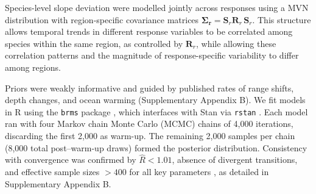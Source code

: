 \documentclass[9pt,twocolumn,twoside]{pnas-new}
\begin{document}
{Species-level slope deviation were modelled jointly across responses using a MVN distribution with region-specific covariance matrices $\boldsymbol{\Sigma_r} = \mathbf{S}_{r}\mathbf{R}_{r}\,\mathbf{S}_{r}$. This structure allows temporal trends in different response variables to be correlated among species within the same region, as controlled by $\mathbf{R}_{r}$, while allowing these correlation patterns and the magnitude of response-specific variability to differ among regions.

Priors were weakly informative and guided by published rates of range shifts, depth changes, and ocean warming (Supplementary Appendix B). We fit models in R using the \texttt{brms} package \citep{burkner_brms_2017}, which interfaces with Stan via \texttt{rstan} \citep{stan2024,stan_development_team_rstan_2024}. Each model ran with four Markov chain Monte Carlo (MCMC) chains of 4,000 iterations, discarding the first 2,000 as warm-up. The remaining 2,000 samples per chain (8,000 total post–warm-up draws) formed the posterior distribution. Consistency with convergence was confirmed by $\hat{R} < 1.01$, absence of divergent transitions, and effective sample sizes $> 400$ for all key parameters \citep{vehtari_rank-normalization_2021}, as detailed in Supplementary Appendix B.
}

\showmatmethods{} 



\showacknow{} %



\bibsplit[22]


\end{document}
